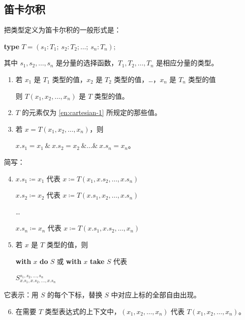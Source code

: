 \documentclass[twoside,11pt,fontset=none]{ctexbook}
\begin{document}
\subsection{笛卡尔积}

把类型定义为笛卡尔积的一般形式是：

\quad \textbf{type} $T = (s_1 : T_1;\ s_2: T_2; \dots ;\ s_n: T_n);$

\noindent
其中 $s_1, s_2, \dots , s_n$ 是分量的选择函数，$T_1, T_2, \dots, T_n$ 是相应分量的类型。

\begin{enumerate}[leftmargin=2\parindent, label=(\arabic*)]
	\item \label{en:cartesian-1}
	若 $x_1$ 是 $T_1$ 类型的值，$x_2$ 是 $T_2$ 类型的值，\dots，$x_n$ 是 $T_n$ 类型的值

	\quad 则 $T(x_1, x_2, \dots, x_n)$ 是 $T$ 类型的值。

	\item $T$ 的元素仅为 \ref{en:cartesian-1} 所规定的那些值。

	\item 若 $x = T(x_1, x_2, \dots, x_n)$，则

	\quad $x.s_1 = x_1\ \&\ x.s_2 = x_2\ \& \dots \&\ x.s_n = x_n$。

\end{enumerate}

\noindent
简写：

\begin{enumerate}[leftmargin=2\parindent, label=(\arabic*)]
	\setcounter{enumi}{3}
	\item $x.s_1 \coloneq x_1$ 代表 $x\coloneq T(x_1, x.s_2, \dots, x.s_n)$

	$x.s_2 \coloneq x_2$ 代表 $x\coloneq T(x.s_1, x_2, \dots, x.s_n)$

	\qquad \dots

	$x.s_n \coloneq x_n$ 代表 $x\coloneq T(x.s_1, x.s_2, \dots, x_n)$

	\item 若 $x$ 是 $T$ 类型的值，则
	
	\textbf{with} $x$ \textbf{do} $S$ 或 \textbf{with} $x$ \textbf{take} $S$ 代表
	
	\quad $S_{x.s_1, x.s_2, \dots, x.s_n}^{s_1, s_2, \dots, s_n}$
\end{enumerate}

\noindent
它表示：用 $S$ 的每个下标，替换 $S$ 中对应上标的全部自由出现。

\begin{enumerate}[leftmargin=2\parindent, label=(\arabic*)]
	\setcounter{enumi}{5}
	\item 在需要 $T$ 类型表达式的上下文中，$(x_1, x_2, \dots, x_n)$ 代表 $T(x_1, x_2, \dots, x_n)$。
\end{enumerate}
\end{document}
